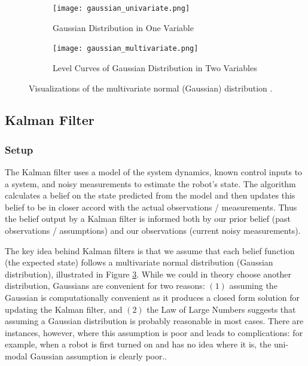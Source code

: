 \documentclass[twoside]{article}
\begin{document}
\begin{figure}[h]
\centering
\begin{subfigure}{.5\textwidth}
  \centering
  \texttt{[image: gaussian\_univariate.png]}
  \caption{Gaussian Distribution in One Variable}
  \label{fig:EKF_best}
\end{subfigure}%
\begin{subfigure}{.5\textwidth}
  \centering
  \texttt{[image: gaussian\_multivariate.png]}
  \caption{Level Curves of Gaussian Distribution in Two Variables}
  \label{fig:EKF_bad}
\end{subfigure}
\caption{Visualizations of the multivariate normal (Gaussian) distribution \cite{Xmisc}.}
\label{fig:Gaussians}
\end{figure}

\subsection{Kalman Filter}
\subsubsection{Setup}
The Kalman filter uses a model of the system dynamics, known control inputs to a system, and noisy measurements to estimate the robot's state. The algorithm calculates a belief on the state predicted from the model and then updates this belief to be in closer accord with the actual observations / measurements. Thus the belief output by a Kalman filter is informed both by our prior belief (past observations / assumptions) and our observations (current noisy measurements).

\par
The key idea behind Kalman filters is that we assume that each belief function (the expected state) follows a multivariate normal distribution (Gaussian distribution), illustrated in Figure \ref{fig:Gaussians}. While we could in theory choose another distribution, Gaussians are convenient for two reasons: $(1)$ assuming the Gaussian is computationally convenient as it produces a closed form solution for updating the Kalman filter, and $(2)$ the Law of Large Numbers suggests that assuming a Gaussian distribution is probably reasonable in most cases. There are instances, however, where this assumption is poor and leads to complications: for example, when a robot is first turned on and has no idea where it is, the uni-modal Gaussian assumption is clearly poor..

\end{document}
